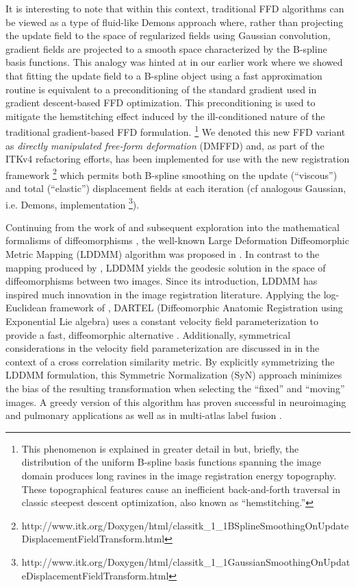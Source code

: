 \documentclass{frontiersSCNS}
\begin{document}
It is interesting to note that within this context, traditional FFD
algorithms can be viewed as a type of fluid-like Demons approach
where, rather than projecting the update field to the space of
regularized fields using Gaussian convolution, gradient fields are
projected to a smooth space characterized by the B-spline basis
functions.  This analogy was hinted at in our earlier work
\citep{tustison2009} where we showed that fitting the update field to
a B-spline object using a fast approximation routine
\citep{tustison2006} is equivalent to a preconditioning of the
standard gradient used in gradient descent-based FFD optimization.
This preconditioning is used to mitigate the hemstitching effect
induced by the ill-conditioned nature of the traditional
gradient-based FFD formulation.%
\footnote{
This phenomenon is explained in greater detail in \cite{tustison2009}
but, briefly, the distribution of the uniform B-spline basis functions
spanning the image domain produces long ravines in the image registration
energy topography.  These topographical features cause an
inefficient back-and-forth traversal in classic steepest descent optimization, also known as ``hemstitching.''
}
We denoted this new FFD variant as
{\it directly manipulated free-form deformation} (DMFFD) and, as part of the
ITKv4 refactoring efforts, has been implemented for use with the new
registration framework%
\footnote{
http://www.itk.org/Doxygen/html/classitk\_1\_1BSplineSmoothingOnUpdateDisplacementFieldTransform.html
}
which permits both B-spline smoothing on the update (``viscous'') and total (``elastic'')
displacement fields at each iteration (cf
analogous Gaussian, i.e. Demons, implementation%
\footnote{
http://www.itk.org/Doxygen/html/classitk\_1\_1GaussianSmoothingOnUpdateDisplacementFieldTransform.html
}).

Continuing from the work of \cite{christensen1996} and subsequent
exploration into the mathematical formalisms of diffeomorphisms
\citep[e.g.][]{dupuis1998}, the well-known Large Deformation
Diffeomorphic Metric Mapping (LDDMM) algorithm was proposed in
\cite{beg2005}.  In contrast to the mapping produced by
\cite{christensen1996}, LDDMM yields the geodesic solution in the
space of diffeomorphisms between two images. Since its introduction,
LDDMM has inspired much innovation in the image registration
literature.  Applying the log-Euclidean framework of
\cite{arsigny2006}, DARTEL (Diffeomorphic Anatomic Registration using
Exponential Lie algebra) uses a constant velocity field
parameterization to provide a fast, diffeomorphic alternative
\citep{ashburner2007}. Additionally, symmetrical considerations in the
velocity field parameterization are discussed in \cite{avants2008} in
the context of a cross correlation similarity metric.  By explicitly
symmetrizing the LDDMM formulation, this Symmetric Normalization (SyN)
approach minimizes the bias of the resulting transformation when selecting the
``fixed'' and ``moving'' images.  A greedy version of this algorithm
has proven successful in neuroimaging \citep{klein2009} and pulmonary
\citep{murphy2011} applications as well as in multi-atlas label fusion \citep{wang2012}.
\end{document}
